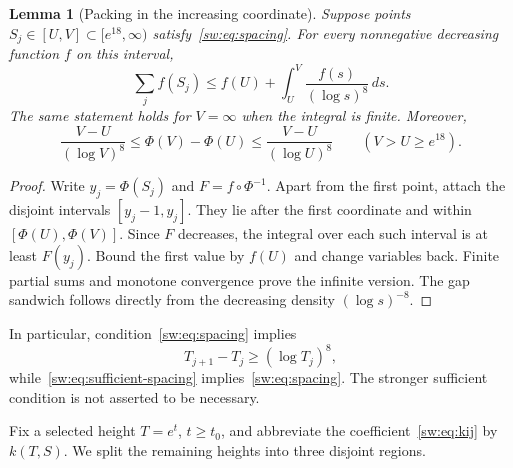 \documentclass[11pt,a4paper]{article}
\numberwithin{equation}{section}
\newtheorem{lemma}[theorem]{Lemma}
\theoremstyle{definition}\newtheorem{definition}[theorem]{Definition}
\theoremstyle{remark}\newtheorem{remark}[theorem]{Remark}
\begin{document}
\begin{lemma}[Packing in the increasing coordinate]\label{sw:lem:packing}
Suppose points $S_j\in[U,V]\subset[e^{18},\infty)$ satisfy~\eqref{sw:eq:spacing}. For every nonnegative decreasing function $f$ on this interval,
\begin{equation}\label{sw:eq:packing}
 \sum_j f(S_j)\le f(U)+\int_U^V\frac{f(s)}{(\log s)^8}\,ds.
\end{equation}
The same statement holds for $V=\infty$ when the integral is finite. Moreover,
\begin{equation}\label{sw:eq:gap-sandwich}
 \frac{V-U}{(\log V)^8}\le\Phi(V)-\Phi(U)
                       \le\frac{V-U}{(\log U)^8}\qquad(V>U\ge e^{18}).
\end{equation}
\end{lemma}
\begin{proof}
Write $y_j=\Phi(S_j)$ and $F=f\circ\Phi^{-1}$. Apart from the first point, attach the disjoint intervals $[y_j-1,y_j]$. They lie after the first coordinate and within $[\Phi(U),\Phi(V)]$. Since $F$ decreases, the integral over each such interval is at least $F(y_j)$. Bound the first value by $f(U)$ and change variables back. Finite partial sums and monotone convergence prove the infinite version. The gap sandwich follows directly from the decreasing density $(\log s)^{-8}$.
\end{proof}
In particular, condition~\eqref{sw:eq:spacing} implies
\begin{equation}\label{sw:eq:gap-lower}
 T_{j+1}-T_j\ge(\log T_j)^8,
\end{equation}
while~\eqref{sw:eq:sufficient-spacing} implies~\eqref{sw:eq:spacing}. The stronger sufficient condition is not asserted to be necessary.

Fix a selected height $T=e^t$, $t\ge t_0$, and abbreviate the coefficient~\eqref{sw:eq:kij} by $k(T,S)$. We split the remaining heights into three disjoint regions.
\end{document}
